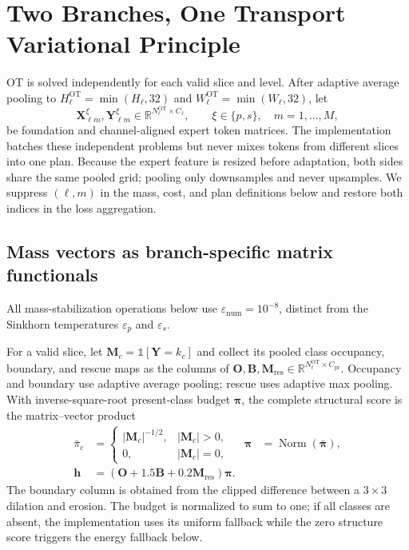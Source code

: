 \documentclass[10pt]{article}
\newcommand{\R}{\mathbb{R}}
\newcommand{\eps}{\varepsilon}
\newcommand{\epsnum}{\varepsilon_{\mathrm{num}}}
\newcommand{\Norm}{\operatorname{Norm}}
\newcommand{\ind}{\mathbb{1}}
\begin{document}
\section{Two Branches, One Transport Variational Principle}

OT is solved independently for each valid slice and level.  After adaptive
average pooling to
$H_\ell^{\mathrm{OT}}=\min(H_\ell,32)$ and
$W_\ell^{\mathrm{OT}}=\min(W_\ell,32)$, let
\begin{equation}
 \bm X_{\ell m}^\xi,\bm Y_{\ell m}^\xi
 \in\R^{N_\ell^{\mathrm{OT}}\times C_\ell},
 \qquad \xi\in\{p,s\},\quad m=1,\ldots,M,
 \label{eq:ot-token-matrices}
\end{equation}
be foundation and channel-aligned expert token matrices.  The implementation
batches these independent problems but never mixes tokens from different
slices into one plan.  Because the expert feature is resized before adaptation,
both sides share the same pooled grid; pooling only downsamples and never
upsamples.  We suppress $(\ell,m)$ in the mass, cost, and plan definitions
below and restore both indices in the loss aggregation.

\subsection{Mass vectors as branch-specific matrix functionals}

All mass-stabilization operations below use $\epsnum=10^{-8}$, distinct from
the Sinkhorn temperatures $\eps_p$ and $\eps_s$.

For a valid slice, let $\bm M_c=\ind[\bm Y=k_c]$ and collect its pooled class
occupancy, boundary, and rescue maps as
the columns of $\bm O,\bm B,\bm M_{\mathrm{res}}
\in\R^{N_\ell^{\mathrm{OT}}\times C_{\mathrm{pr}}}$.  Occupancy
and boundary use adaptive average pooling; rescue uses adaptive max pooling.
With inverse-square-root present-class budget $\bm\pi$, the complete structural
score is the matrix--vector product
\begin{equation}
\begin{aligned}
 \bar\pi_c&=\begin{cases}
   |\bm M_c|^{-1/2},&|\bm M_c|>0,\\
   0,&|\bm M_c|=0,
  \end{cases}
 &\bm\pi&=\Norm(\bar{\bm\pi}),\\
 \bm h&=(\bm O+1.5\bm B+0.2\bm M_{\mathrm{res}})\bm\pi.
\end{aligned}
    \label{eq:matrix-structure-score}
\end{equation}
The boundary column is obtained from the clipped difference between a
$3\times3$ dilation and erosion.  The budget is normalized to sum to one; if
all classes are absent, the implementation uses its uniform fallback while the
zero structure score triggers the energy fallback below.
\end{document}
